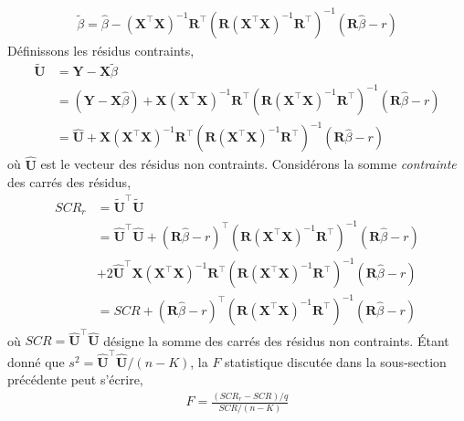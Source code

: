 \begin{align*}
\tilde{\beta} = \widehat{\beta} - (\mathbf{X}^\top\mathbf{X})^{-1}\mathbf{R}^\top\left(\mathbf{R}(\mathbf{X}^\top\mathbf{X})^{-1}\mathbf{R}^\top\right)^{-1}(\mathbf{R}\widehat{\beta}-r)
\end{align*}
Définissons les résidus contraints,
\begin{align*}
\tilde{\mathbf{U}}&=\mathbf{Y}-\mathbf{X}\tilde{\beta}\\
&=(\mathbf{Y}-\mathbf{X}\widehat{\beta}) + \mathbf{X}(\mathbf{X}^\top\mathbf{X})^{-1}\mathbf{R}^\top\left(\mathbf{R}(\mathbf{X}^\top\mathbf{X})^{-1}\mathbf{R}^\top\right)^{-1}(\mathbf{R}\widehat{\beta}-r)\\
&=\widehat{\mathbf{U}} + \mathbf{X}(\mathbf{X}^\top\mathbf{X})^{-1}\mathbf{R}^\top\left(\mathbf{R}(\mathbf{X}^\top\mathbf{X})^{-1}\mathbf{R}^\top\right)^{-1}(\mathbf{R}\widehat{\beta}-r)
\end{align*}
où $\widehat{\mathbf{U}}$ est le vecteur des résidus non contraints. Considérons la somme \emph{contrainte} des carrés des résidus,
\begin{align*}
SCR_r &= \tilde{\mathbf{U}}^\top\tilde{\mathbf{U}}\\
&= \widehat{\mathbf{U}}^\top\widehat{\mathbf{U}} + (\mathbf{R}\widehat{\beta} - r)^\top
\left(\mathbf{R}(\mathbf{X}^\top \mathbf{X})^{-1}\mathbf{R}^\top\right)^{-1}(\mathbf{R}\widehat{\beta} - r)\\
&+ 2\widehat{\mathbf{U}}^\top\mathbf{X}(\mathbf{X}^\top\mathbf{X})^{-1}\mathbf{R}^\top\left(\mathbf{R}(\mathbf{X}^\top\mathbf{X})^{-1}\mathbf{R}^\top\right)^{-1}(\mathbf{R}\widehat{\beta}-r)\\
&=SCR + (\mathbf{R}\widehat{\beta}-r)^\top\left(\mathbf{R}(\mathbf{X}^\top\mathbf{X})^{-1}\mathbf{R}^\top\right)^{-1}  (\mathbf{R}\widehat{\beta}-r)
\end{align*}
où $SCR = \widehat{\mathbf{U}}^\top\widehat{\mathbf{U}}$ désigne la somme des carrés des résidus non contraints. \'Etant donné que $s^2 = \widehat{\mathbf{U}}^\top\widehat{\mathbf{U}}/(n-K)$, la $F$ statistique discutée dans la sous-section précédente peut s'écrire,
\begin{align}
F = \frac{(SCR_r -SCR)/q}{SCR/(n-K)}
\label{eq46}
\end{align}
